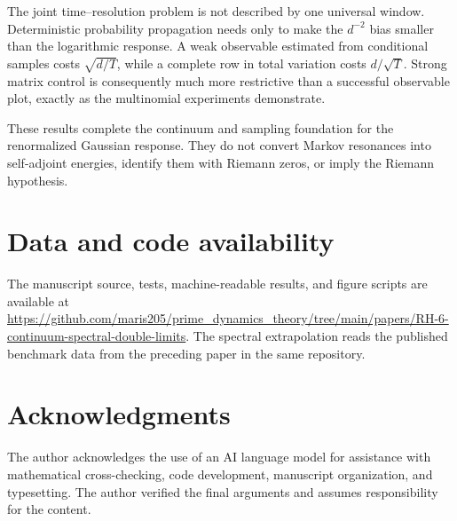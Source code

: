 \documentclass[11pt]{article}
\theoremstyle{definition}
\theoremstyle{remark}
\begin{document}
The joint time--resolution problem is not described by one universal window.
Deterministic probability propagation needs only to make the $d^{-2}$ bias
smaller than the logarithmic response.  A weak observable estimated from
conditional samples costs $\sqrt{d/T}$, while a complete row in total
variation costs $d/\sqrt T$.  Strong matrix control is consequently much more
restrictive than a successful observable plot, exactly as the multinomial
experiments demonstrate.

These results complete the continuum and sampling foundation for the
renormalized Gaussian response.  They do not convert Markov resonances into
self-adjoint energies, identify them with Riemann zeros, or imply the Riemann
hypothesis.

\section*{Data and code availability}

The manuscript source, tests, machine-readable results, and figure scripts
are available at
\url{https://github.com/maris205/prime_dynamics_theory/tree/main/papers/RH-6-continuum-spectral-double-limits}.
The spectral extrapolation reads the published benchmark data from the
preceding paper in the same repository.

\section*{Acknowledgments}

The author acknowledges the use of an AI language model for assistance with
mathematical cross-checking, code development, manuscript organization, and
typesetting.  The author verified the final arguments and assumes
responsibility for the content.

{\small


}
\end{document}
